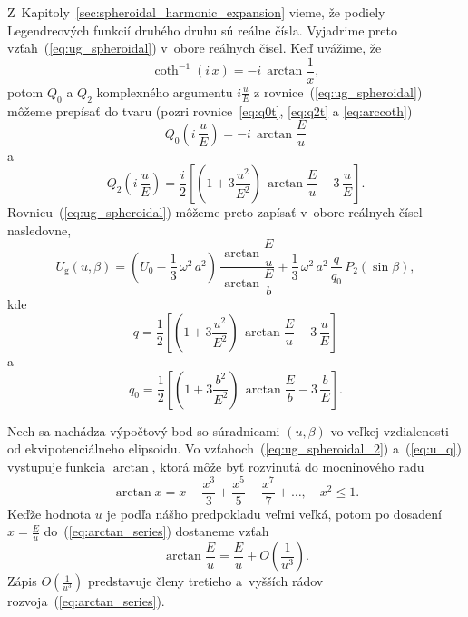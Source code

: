 \documentclass[a4paper,12pt]{book}
\newcommand{\gidx}{\mathrm g}
\begin{document}
Z~Kapitoly~\ref{sec:spheroidal_harmonic_expansion} vieme, že podiely 
Legendreových funkcií druhého druhu sú reálne čísla.  Vyjadrime preto 
vzťah~(\ref{eq:ug_spheroidal}) v~obore reálnych čísel.  Keď uvážime, že
%
\begin{equation}
\coth^{-1} (i \, x) = -i \, \arctan\frac{1}{x}{,}
\end{equation}
%
potom $Q_0$ a $Q_2$ komplexného argumentu $i \frac{u}{E}$ 
z rovnice~(\ref{eq:ug_spheroidal}) môžeme prepísať do tvaru (pozri 
rovnice~\ref{eq:q0t}, \ref{eq:q2t} a \ref{eq:arccoth})
%
\begin{equation}
Q_0\left( i \, \frac{u}{E} \right) = -i \, \arctan\frac{E}{u}
\end{equation}
%
a
%
\begin{equation}
Q_2\left( i \, \frac{u}{E} \right) = \frac{i}{2} \left[ \left( 
1 + 3 \frac{u^2}{E^2} \right) \, \arctan\frac{E}{u} - 3 \, \frac{u}{E} 
\right]{.}
\end{equation}
%
Rovnicu~(\ref{eq:ug_spheroidal}) môžeme preto zapísať v~obore reálnych čísel 
nasledovne,
%
\begin{equation}
\label{eq:ug_spheroidal_2}
U_\gidx(u, \beta) = \left( U_0 - \frac{1}{3} \, \omega^2 \, a^2 \right) \, 
\frac{\arctan\dfrac{E}{u}}{\arctan\dfrac{E}{b}} + \frac{1}{3} \, \omega^2 \, 
a^2 \, \frac{q}{q_0} \, P_2(\sin\beta){,}
\end{equation}
%
kde
%
\begin{equation}
\label{eq:u_q}
q = \frac{1}{2} \left[ \left( 1 + 3 \frac{u^2}{E^2} \right) \, 
\arctan\frac{E}{u} - 3 \, \frac{u}{E} \right]
\end{equation}
%
a
%
\begin{equation}
q_0 = \frac{1}{2} \left[ \left( 1 + 3 \frac{b^2}{E^2} \right) \, 
\arctan\frac{E}{b} - 3 \, \frac{b}{E} \right]{.}
\end{equation}

Nech sa nachádza výpočtový bod so súradnicami $(u, \beta)$ vo veľkej 
vzdialenosti od ekvipotenciálneho elipsoidu.  Vo 
vzťahoch~(\ref{eq:ug_spheroidal_2}) a~(\ref{eq:u_q}) vystupuje funkcia 
$\arctan$, ktorá môže byť rozvinutá  do mocninového radu 
\parencite{Gradshteyn2007}
%
\begin{equation}
\label{eq:arctan_series}
\arctan x = x - \frac{x^3}{3} + \frac{x^5}{5} - \frac{x^7}{7} + \dots{,} \quad 
x^2 \leq 1{.}
\end{equation}
%
Keďže hodnota $u$ je podľa nášho predpokladu veľmi veľká, potom po dosadení $x 
= \frac{E}{u}$ do~(\ref{eq:arctan_series}) dostaneme vzťah
%
\begin{equation}
\label{eq:eu_atan}
\arctan\frac{E}{u} = \frac{E}{u} + O\left( \frac{1}{u^3} \right){.}
\end{equation}
%
Zápis $O\left( \frac{1}{u^3} \right)$ predstavuje členy tretieho a~vyšších 
rádov rozvoja~(\ref{eq:arctan_series}).
\end{document}
